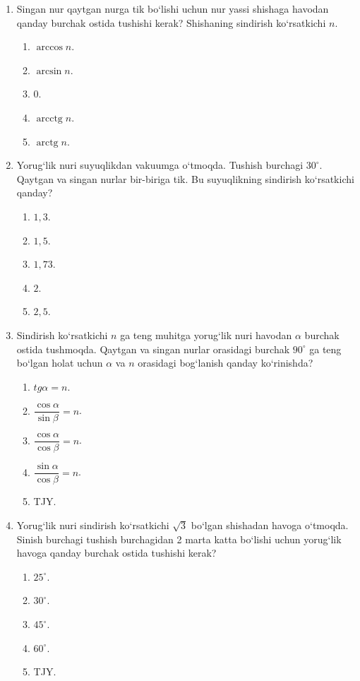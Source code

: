 \begin{enumerate}
\item Singan nur qaytgan nurga tik bo‘lishi uchun nur yassi shishaga havodan qanday burchak ostida tushishi kerak? Shishaning sindirish ko‘rsatkichi $n$.
\begin{enumerate}[label=\Alph*)]
\item $\arccos n$.
\item $\arcsin n$.
\item $0$.
\item $\operatorname{arcctg} n$.
\item $\operatorname{arctg} n$.
\end{enumerate}

\item Yorug‘lik nuri suyuqlikdan vakuumga o‘tmoqda. Tushish burchagi $30^\circ$. Qaytgan va singan nurlar bir-biriga tik. Bu suyuqlikning sindirish ko‘rsatkichi qanday?
\begin{enumerate}[label=\Alph*)]
\item $1{,}3$.
\item $1{,}5$.
\item $1{,}73$.
\item $2$.
\item $2{,}5$.
\end{enumerate}

\item Sindirish ko‘rsatkichi $n$ ga teng muhitga yorug‘lik nuri havodan $\alpha$ burchak ostida tushmoqda. Qaytgan va singan nurlar orasidagi burchak $90^\circ$ ga teng bo‘lgan holat uchun $\alpha$ va $n$ orasidagi bog‘lanish qanday ko‘rinishda?
\begin{enumerate}[label=\Alph*)]
\item $tg\alpha=n$.
\item $\dfrac{\cos\alpha}{\sin\beta}=n$.
\item $\dfrac{\cos\alpha}{\cos\beta}=n$.
\item $\dfrac{\sin\alpha}{\cos\beta}=n$.
\item TJY.
\end{enumerate}

\item Yorug‘lik nuri sindirish ko‘rsatkichi $\sqrt{3}$ bo‘lgan shishadan havoga o‘tmoqda. Sinish burchagi tushish burchagidan 2 marta katta bo‘lishi uchun yorug‘lik havoga qanday burchak ostida tushishi kerak?
\begin{enumerate}[label=\Alph*)]
\item $25^\circ$.
\item $30^\circ$.
\item $45^\circ$.
\item $60^\circ$.
\item TJY.
\end{enumerate}


\end{enumerate}
